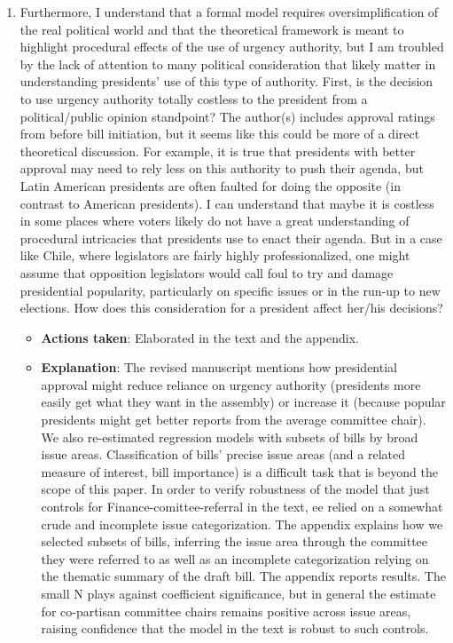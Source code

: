 \documentclass[article,letterpaper,times,12pt,listings-bw,microtype]{article}
\begin{document}
\begin{enumerate}
\begin{itemize}
\end{itemize}
\item Furthermore, I understand that a formal model requires oversimplification of the real political world and that the theoretical framework is meant to highlight procedural effects of the use of urgency authority, but I am troubled by the lack of attention to many political consideration that likely matter in understanding presidents' use of this type of authority. First, is the decision to use urgency authority totally costless to the president from a political/public opinion standpoint? The author(s) includes approval ratings from before bill initiation, but it seems like this could be more of a direct theoretical discussion. For example, it is true that presidents with better approval may need to rely less on this authority to push their agenda, but Latin American presidents are often faulted for doing the opposite (in contrast to American presidents). I can understand that maybe it is costless in some places where voters likely do not have a great understanding of procedural intricacies that presidents use to enact their agenda. But in a case like Chile, where legislators are fairly highly professionalized, one might assume that opposition legislators would call foul to try and damage presidential popularity, particularly on specific issues or in the run-up to new elections. How does this consideration for a president affect her/his decisions?
\label{sec:org10fa7d1}
\begin{itemize}
\item \textbf{Actions taken}: Elaborated in the text and the appendix.
\item \textbf{Explanation}: The revised manuscript mentions how presidential approval might reduce reliance on urgency authority (presidents more easily get what they want in the assembly) or increase it (because popular presidents might get better reports from the average committee chair). We also re-estimated regression models with subsets of bills by broad issue areas. Classification of bills' precise issue areas (and a related measure of interest, bill importance) is a difficult task that is beyond the scope of this paper. In order to verify robustness of the model that just controls for Finance-comittee-referral in the text, ee relied on a somewhat crude and incomplete issue categorization. The appendix explains how we selected subsets of bills, inferring the issue area through the committee they were referred to as well as an incomplete categorization relying on the thematic summary of the draft bill. The appendix reports results. The small N plays against coefficient significance, but in general the estimate for co-partisan committee chairs remains positive across issue areas, raising confidence that the model in the text is robust to such controls.

\end{itemize}
\end{enumerate}
\end{document}
